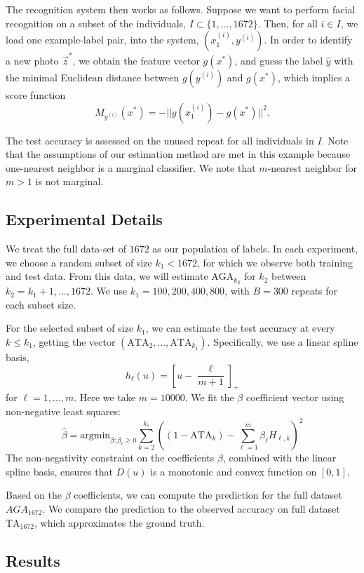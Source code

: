 \documentclass[twoside,11pt]{article}
\newcommand{\argmin}{\text{argmin}}
\begin{document}
The recognition system then works as follows.  Suppose we want to
perform facial recognition on a subset of the individuals, $I \subset
\{1,\hdots, 1672\}$.  Then, for all $i \in I$, we load one example-label pair, into the system, $(x_1^{(i)}, y^{(i)})$.  In
order to identify a new photo $\vec{z}^*$, we obtain the feature
vector $g(x^*)$, and guess the label $\hat{y}$
with the minimal Euclidean distance between $g(y^{(i)})$ and $g(x^*)$,
which implies a score function
\[
M_{y^{(i)}}(x^*) = -||g(x_1^{(i)}) - g(x^*)||^2.
\]


The test accuracy is assessed on the unused repeat for all individuals
in $I$.  Note that the assumptions of our estimation method are met in
this example because one-nearest neighbor is a marginal classifier.
We note that $m$-nearest neighbor for $m > 1$ is not marginal.

\subsection{Experimental Details}\label{sec:exp_details}
We treat the full data-set of $1672$ as our population of labels. In
each experiment, we choose a random subset of size $k_1<1672$, for
which we observe both training and test data. From this data, we will
estimate $\text{AGA}_{k_2}$ for $k_2$ between $k_2 =
k_1+1,...,1672$. We use $k_1 = 100,200,400,800$, with $B = 300$
repeats for each subset size.

For the selected subset of size $k_1$, we can estimate the test
accuracy at every $k \leq k_1$, getting the vector
$(\text{ATA}_2,...,\text{ATA}_{k_1})$.  Specifically, we use a linear
spline basis,
\[
h_\ell(u) = \left[u - \frac{\ell}{m + 1}\right]_+
\]
for $\ell = 1,\hdots, m$.  Here we take $m = 10000$. 
We fit the $\beta$ coefficient vector using non-negative least squares: 
\[
\hat{\beta} = \argmin_{\beta: \beta_\ell \geq 0} \sum_{k=2}^{k_1} \left( (1 - \text{ATA}_k) - \sum_{\ell=1}^m \beta_\ell H_{\ell, k}\right)^2
\]
The non-negativity constraint on the coefficients $\beta$, combined
with the linear spline basis, ensures that ${D}(u)$ is a monotonic
and convex function on $[0,1]$.

Based on the $\beta$ coefficients, we can compute the prediction for
the full dataset $\hat{AGA}_{1672}$.  We compare the prediction to the
observed accuracy on full dataset $\text{TA}_{1672}$, which
approximates the ground truth.

\subsection{Results}
\end{document}
